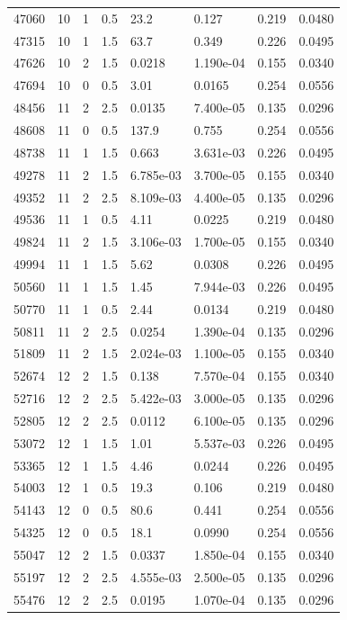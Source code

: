 \documentclass[preview]{standalone}
\begin{document}
{{{{\begin{tabular}{L{1.2cm}C{1.2cm} C{0.3cm}C{0.5cm} C{1.4cm}C{1.4cm} C{1.4cm}C{1.4cm}}
  47060  &    10  & 1     & 0.5 &  23.2  & 0.127  & 0.219 &  0.0480   \\ 
  47315  &    10  & 1     & 1.5 &  63.7  & 0.349  & 0.226 &  0.0495   \\ 
  47626  &    10  & 2     & 1.5 &  0.0218  & 1.190e-04  & 0.155 &  0.0340   \\ 
  47694  &    10  & 0     & 0.5 &  3.01  & 0.0165  & 0.254 &  0.0556   \\ 
  48456  &    11  & 2     & 2.5 &  0.0135  & 7.400e-05  & 0.135 &  0.0296   \\ 
  48608  &    11  & 0     & 0.5 &  137.9  & 0.755  & 0.254 &  0.0556   \\ 
  48738  &    11  & 1     & 1.5 &  0.663  & 3.631e-03  & 0.226 &  0.0495   \\ 
  49278  &    11  & 2     & 1.5 &  6.785e-03  & 3.700e-05  & 0.155 &  0.0340   \\ 
  49352  &    11  & 2     & 2.5 &  8.109e-03  & 4.400e-05  & 0.135 &  0.0296   \\ 
  49536  &    11  & 1     & 0.5 &  4.11  & 0.0225  & 0.219 &  0.0480   \\ 
  49824  &    11  & 2     & 1.5 &  3.106e-03  & 1.700e-05  & 0.155 &  0.0340   \\ 
  49994  &    11  & 1     & 1.5 &  5.62  & 0.0308  & 0.226 &  0.0495   \\ 
  50560  &    11  & 1     & 1.5 &  1.45  & 7.944e-03  & 0.226 &  0.0495   \\ 
  50770  &    11  & 1     & 0.5 &  2.44  & 0.0134  & 0.219 &  0.0480   \\ 
  50811  &    11  & 2     & 2.5 &  0.0254  & 1.390e-04  & 0.135 &  0.0296   \\ 
  51809  &    11  & 2     & 1.5 &  2.024e-03  & 1.100e-05  & 0.155 &  0.0340   \\ 
  52674  &    12  & 2     & 1.5 &  0.138  & 7.570e-04  & 0.155 &  0.0340   \\ 
  52716  &    12  & 2     & 2.5 &  5.422e-03  & 3.000e-05  & 0.135 &  0.0296   \\ 
  52805  &    12  & 2     & 2.5 &  0.0112  & 6.100e-05  & 0.135 &  0.0296   \\ 
  53072  &    12  & 1     & 1.5 &  1.01  & 5.537e-03  & 0.226 &  0.0495   \\ 
  53365  &    12  & 1     & 1.5 &  4.46  & 0.0244  & 0.226 &  0.0495   \\ 
  54003  &    12  & 1     & 0.5 &  19.3  & 0.106  & 0.219 &  0.0480   \\ 
  54143  &    12  & 0     & 0.5 &  80.6  & 0.441  & 0.254 &  0.0556   \\ 
  54325  &    12  & 0     & 0.5 &  18.1  & 0.0990  & 0.254 &  0.0556   \\ 
  55047  &    12  & 2     & 1.5 &  0.0337  & 1.850e-04  & 0.155 &  0.0340   \\ 
  55197  &    12  & 2     & 2.5 &  4.555e-03  & 2.500e-05  & 0.135 &  0.0296   \\ 
  55476  &    12  & 2     & 2.5 &  0.0195  & 1.070e-04  & 0.135 &  0.0296   \\ 
\hline 
\end{tabular} 

}}}}
\end{document}

